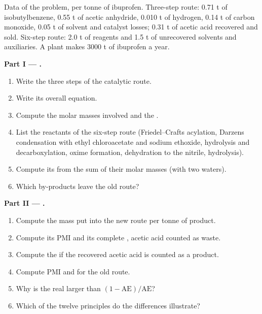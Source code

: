 \begin{problem}
\label{pb:b3:green-industrial:1}
Data of the problem, per tonne of ibuprofen. Three-step route: 0.71 t of
isobutylbenzene, 0.55 t of acetic anhydride, 0.010 t of hydrogen, 0.14 t of carbon
monoxide, 0.05 t of solvent and catalyst losses; 0.31 t of acetic acid recovered
and sold. Six-step route: 2.0 t of reagents and 1.5 t of unrecovered solvents
and auxiliaries. A plant makes 3000 t of ibuprofen a year.

\medskip\noindent\textbf{Part I --- .}
\begin{enumerate}
  \item Write the three steps of the catalytic route.
  \item Write its overall equation.
  \item Compute the molar masses involved and the .
  \item List the reactants of the six-step route (Friedel--Crafts acylation, Darzens
        condensation with ethyl chloroacetate and sodium ethoxide, hydrolysis and
        decarboxylation, oxime formation, dehydration to the nitrile, hydrolysis).
  \item Compute its  from the sum of their molar masses (with two
        waters).
  \item Which by-products leave the old route?
\end{enumerate}

\medskip\noindent\textbf{Part II --- .}
\begin{enumerate}[resume]
  \item Compute the mass put into the new route per tonne of product.
  \item Compute its PMI and its complete , acetic acid counted as waste.
  \item Compute the  if the recovered acetic acid is counted as a product.
  \item Compute PMI and  for the old route.
  \item Why is the real  larger than $(1 - \mathrm{AE})/\mathrm{AE}$?
  \item Which of the twelve principles do the differences illustrate?
\end{enumerate}


\end{problem}
